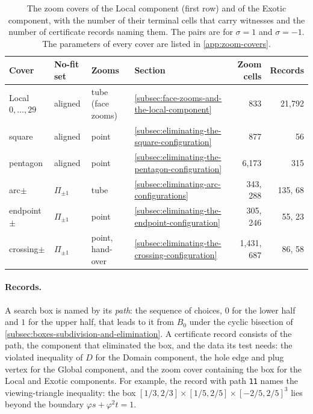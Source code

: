 \begin{table}[htbp]
\centering\small
\begin{tabular}{llllrr}
  \toprule
  Cover & No-fit set & Zooms & Section & Zoom cells & Records\\
  \midrule
  Local $0,\dots,29$ & aligned & tube (face zooms) & \ref{subsec:face-zooms-and-the-local-component} & 833 & 21{,}792\\
  square & aligned & point & \ref{subsec:eliminating-the-square-configuration} & 877 & 56\\
  pentagon & aligned & point & \ref{subsec:eliminating-the-pentagon-configuration} & 6{,}173 & 315\\
  arc$\pm$ & $\Pi_{\pm1}$ & tube & \ref{subsec:eliminating-arc-configurations} & 343, 288 & 135, 68\\
  endpoint$\pm$ & $\Pi_{\pm1}$ & point & \ref{subsec:eliminating-the-endpoint-configuration} & 305, 246 & 55, 23\\
  crossing$\pm$ & $\Pi_{\pm1}$ & point, hand-over & \ref{subsec:eliminating-the-crossing-configuration} & 1{,}431, 687 & 86, 58\\
  \bottomrule
\end{tabular}
\caption{The zoom covers of the Local component (first row) and of the
Exotic component, with the number of their terminal cells that carry
witnesses and the number of certificate records naming them. The pairs are
for $\sigma=1$ and $\sigma=-1$. The parameters of every cover are listed in
\cref{app:zoom-covers}.}
\label{tab:covers}
\end{table}

\paragraph{Records.}
A search box is named by its \emph{path}: the sequence of choices, $0$ for the
lower half and $1$ for the upper half, that leads to it from $B_0$ under the
cyclic bisection of \cref{subsec:boxes-subdivision-and-elimination}. A
certificate record consists of the path, the component that eliminated the
box, and the data its test needs: the violated inequality of $D$ for the
Domain component, the hole edge and plug vertex for the Global component,
and the zoom cover containing the box for the Local and Exotic
components. For example, the record with path \texttt{11} names the
viewing-triangle inequality: the box
$[1/3,2/3]\times[1/5,2/5]\times{[-2/5,2/5]}^3$ lies beyond the boundary
$\varphi s+\varphi^2t=1$.

